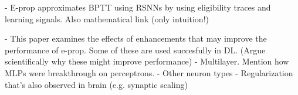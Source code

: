 \begin{tcolorbox}[colback=orange]

- E-prop approximates BPTT using RSNNs by using eligibility traces and learning signals. Also mathematical link (only intuition!)


\end{tcolorbox}

\begin{tcolorbox}[colback=orange]

- This paper examines the effects of enhancements that may improve the performance of e-prop. Some of these are used succesfully in DL. (Argue scientifically why these might improve performance)
    - Multilayer. Mention how MLPs were breakthrough on perceptrons.
    - Other neuron types
    - Regularization that's also observed in brain (e.g. synaptic scaling)


\end{tcolorbox}
